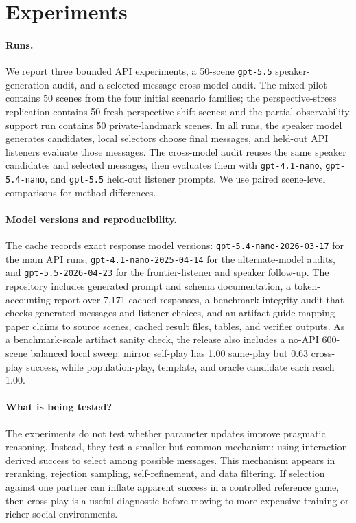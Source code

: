 \section{Experiments}

\paragraph{Runs.}
We report three bounded API experiments, a 50-scene \texttt{gpt-5.5} speaker-generation audit, and a selected-message cross-model audit. The mixed pilot contains 50 scenes from the four initial scenario families; the perspective-stress replication contains 50 fresh perspective-shift scenes; and the partial-observability support run contains 50 private-landmark scenes. In all runs, the speaker model generates candidates, local selectors choose final messages, and held-out API listeners evaluate those messages. The cross-model audit reuses the same speaker candidates and selected messages, then evaluates them with \texttt{gpt-4.1-nano}, \texttt{gpt-5.4-nano}, and \texttt{gpt-5.5} held-out listener prompts. We use paired scene-level comparisons for method differences.

\paragraph{Model versions and reproducibility.}
The cache records exact response model versions: \texttt{\footnotesize gpt-5.4-nano-2026-03-17} for the main API runs, \texttt{\footnotesize gpt-4.1-nano-2025-04-14} for the alternate-model audits, and \texttt{\footnotesize gpt-5.5-2026-04-23} for the frontier-listener and speaker follow-up. The repository includes generated prompt and schema documentation, a token-accounting report over 7,171 cached responses, a benchmark integrity audit that checks generated messages and listener choices, and an artifact guide mapping paper claims to source scenes, cached result files, tables, and verifier outputs. As a benchmark-scale artifact sanity check, the release also includes a no-API 600-scene balanced local sweep: mirror self-play has 1.00 same-play but 0.63 cross-play success, while population-play, template, and oracle candidate each reach 1.00.

\paragraph{What is being tested?}
The experiments do not test whether parameter updates improve pragmatic reasoning. Instead, they test a smaller but common mechanism: using interaction-derived success to select among possible messages. This mechanism appears in reranking, rejection sampling, self-refinement, and data filtering. If selection against one partner can inflate apparent success in a controlled reference game, then cross-play is a useful diagnostic before moving to more expensive training or richer social environments.

